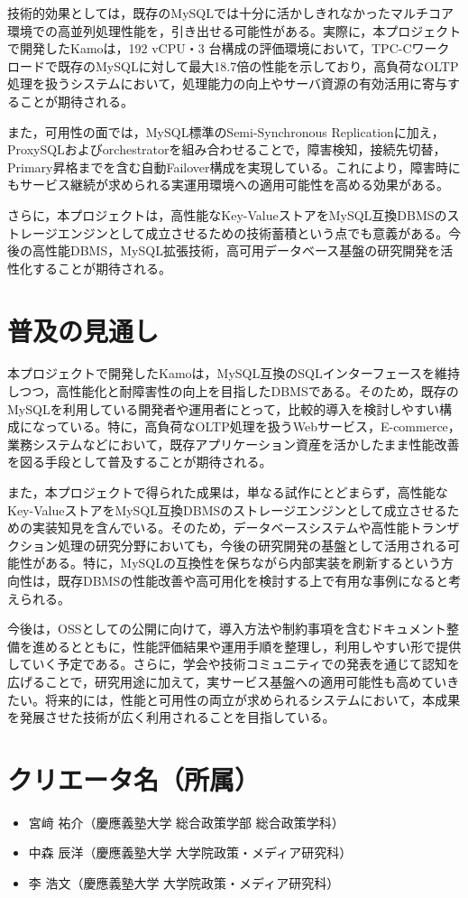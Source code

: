 \documentclass[uplatex,a4paper,12pt]{jsarticle}
\begin{document}
技術的効果としては，既存のMySQLでは十分に活かしきれなかったマルチコア環境での高並列処理性能を，引き出せる可能性がある。実際に，本プロジェクトで開発したKamoは，192 vCPU・3 台構成の評価環境において，TPC-Cワークロードで既存のMySQLに対して最大18.7倍の性能を示しており，高負荷なOLTP処理を扱うシステムにおいて，処理能力の向上やサーバ資源の有効活用に寄与することが期待される。

また，可用性の面では，MySQL標準のSemi-Synchronous Replicationに加え，ProxySQLおよびorchestratorを組み合わせることで，障害検知，接続先切替，Primary昇格までを含む自動Failover構成を実現している。これにより，障害時にもサービス継続が求められる実運用環境への適用可能性を高める効果がある。

さらに，本プロジェクトは，高性能なKey-ValueストアをMySQL互換DBMSのストレージエンジンとして成立させるための技術蓄積という点でも意義がある。今後の高性能DBMS，MySQL拡張技術，高可用データベース基盤の研究開発を活性化することが期待される。

\section{普及の見通し}

本プロジェクトで開発したKamoは，MySQL互換のSQLインターフェースを維持しつつ，高性能化と耐障害性の向上を目指したDBMSである。そのため，既存のMySQLを利用している開発者や運用者にとって，比較的導入を検討しやすい構成になっている。特に，高負荷なOLTP処理を扱うWebサービス，E-commerce，業務システムなどにおいて，既存アプリケーション資産を活かしたまま性能改善を図る手段として普及することが期待される。

また，本プロジェクトで得られた成果は，単なる試作にとどまらず，高性能なKey-ValueストアをMySQL互換DBMSのストレージエンジンとして成立させるための実装知見を含んでいる。そのため，データベースシステムや高性能トランザクション処理の研究分野においても，今後の研究開発の基盤として活用される可能性がある。特に，MySQLの互換性を保ちながら内部実装を刷新するという方向性は，既存DBMSの性能改善や高可用化を検討する上で有用な事例になると考えられる。

今後は，OSSとしての公開に向けて，導入方法や制約事項を含むドキュメント整備を進めるとともに，性能評価結果や運用手順を整理し，利用しやすい形で提供していく予定である。さらに，学会や技術コミュニティでの発表を通じて認知を広げることで，研究用途に加えて，実サービス基盤への適用可能性も高めていきたい。将来的には，性能と可用性の両立が求められるシステムにおいて，本成果を発展させた技術が広く利用されることを目指している。

\section{クリエータ名（所属）}
\begin{itemize}
  \item 宮﨑 祐介（慶應義塾大学 総合政策学部 総合政策学科）
  \item 中森 辰洋（慶應義塾大学 大学院政策・メディア研究科）
  \item 李 浩文（慶應義塾大学 大学院政策・メディア研究科）
\end{itemize}
\end{document}
